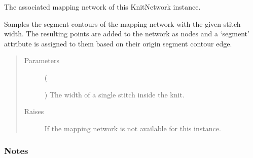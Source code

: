 \documentclass[letterpaper,10pt,english]{sphinxmanual}
\begin{document}
\begin{fulllineitems}
\begin{fulllineitems}
\end{fulllineitems}


\begin{fulllineitems}
\label{\detokenize{cockatoo:cockatoo.KnitNetwork.mapping_network}}
The associated mapping network of this KnitNetwork instance.

\end{fulllineitems}


\begin{fulllineitems}
\label{\detokenize{cockatoo:cockatoo.KnitNetwork.sample_segment_contours}}
Samples the segment contours of the mapping network with the given
stitch width. The resulting points are added to the network as nodes
and a ‘segment’ attribute is assigned to them based on their origin
segment contour edge.
\begin{quote}\begin{description}
\item[{Parameters}] \leavevmode
{} (%
\begin{footnote}[139]\sphinxAtStartFootnote
{}
%
\end{footnote}) \textendash{} The width of a single stitch inside the knit.

\item[{Raises}] \leavevmode
{\hyperref[\detokenize{cockatoo:cockatoo.exception.MappingNetworkError}]{}} \textendash{} If the mapping network is not available for this instance.

\end{description}\end{quote}
\subsubsection*{Notes}


\end{fulllineitems}
\end{fulllineitems}
\end{document}
